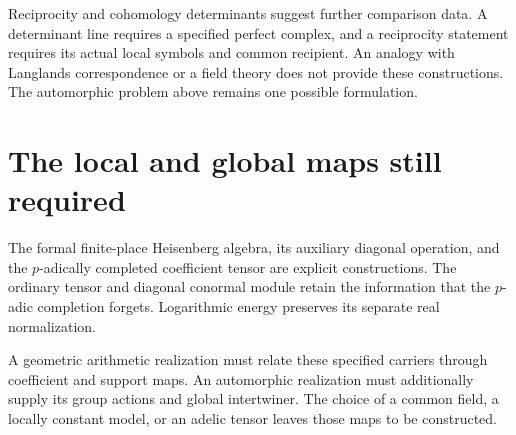 \begin{remark}
Reciprocity and cohomology determinants suggest further comparison
data. A determinant line requires a specified perfect complex,
and a reciprocity statement requires its actual local symbols
and common recipient. An analogy with Langlands correspondence
or a field theory does not provide these constructions.
The automorphic problem above remains one possible formulation.
\end{remark}

\section{The local and global maps still required}
\label{v4-arith:dk:summary}

The formal finite-place Heisenberg algebra, its auxiliary diagonal
operation, and the \(p\)-adically completed coefficient tensor
are explicit constructions. The ordinary tensor and diagonal
conormal module retain the information that the \(p\)-adic
completion forgets. Logarithmic energy preserves its separate
real normalization.

A geometric arithmetic realization must relate these specified
carriers through coefficient and support maps. An automorphic
realization must additionally supply its group actions and global
intertwiner. The choice of a common field, a locally constant
model, or an adelic tensor leaves those maps to be constructed.
